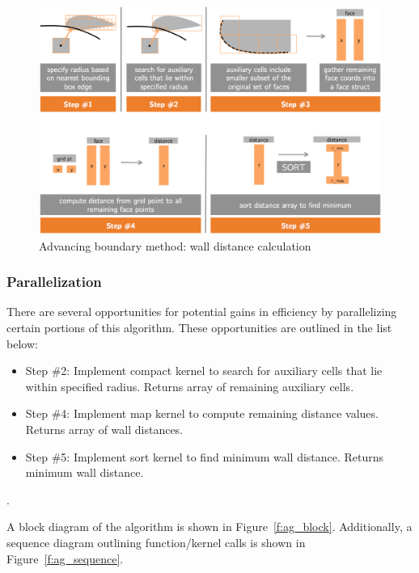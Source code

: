 \documentclass[]{aiaa-tc}%
\begin{document}
\begin{figure}
  \centering
  \includegraphics[width=0.95\linewidth]{figures/auxiliary_grid/algorithm_diagram}
\caption{Advancing boundary method: wall distance calculation}
\label{f:ab_diagram}
\end{figure}

\subsubsection{Parallelization}
There are several opportunities for potential gains in efficiency by
parallelizing certain portions of this algorithm. These opportunities
are outlined in the list below:

\begin{itemize}
\item Step \#2: Implement compact kernel to search for auxiliary cells
  that lie within specified radius. Returns array of remaining
  auxiliary cells.
  
\item Step \#4: Implement map kernel to compute remaining distance
  values. Returns array of wall distances.
  
\item Step \#5: Implement sort kernel to find minimum wall
  distance. Returns minimum wall distance.
\end{itemize}.

A block diagram of the algorithm is shown in
Figure~\ref{f:ag_block}. Additionally, a sequence diagram outlining
function/kernel calls is shown in Figure~\ref{f:ag_sequence}.
\end{document}
